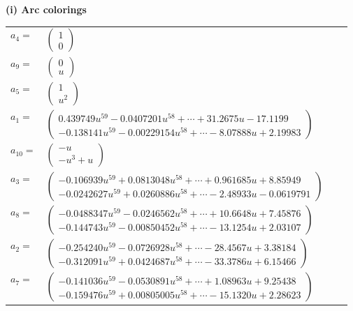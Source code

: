 \documentclass[1p]{elsarticle_modified}
\theoremstyle{definition}
\begin{document}
\flushleft \textbf{(i) Arc colorings}\\
\begin{tabular}{m{7pt} m{180pt} m{7pt} m{180pt} }
\flushright $a_{4}=$&$\begin{pmatrix}1\\0\end{pmatrix}$ \\
\flushright $a_{9}=$&$\begin{pmatrix}0\\u\end{pmatrix}$ \\
\flushright $a_{5}=$&$\begin{pmatrix}1\\u^2\end{pmatrix}$ \\
\flushright $a_{1}=$&$\begin{pmatrix}0.439749 u^{59}-0.0407201 u^{58}+\cdots+31.2675 u-17.1199\\-0.138141 u^{59}-0.00229154 u^{58}+\cdots-8.07888 u+2.19983\end{pmatrix}$ \\
\flushright $a_{10}=$&$\begin{pmatrix}- u\\- u^3+u\end{pmatrix}$ \\
\flushright $a_{3}=$&$\begin{pmatrix}-0.106939 u^{59}+0.0813048 u^{58}+\cdots+0.961685 u+8.85949\\-0.0242627 u^{59}+0.0260886 u^{58}+\cdots-2.48933 u-0.0619791\end{pmatrix}$ \\
\flushright $a_{8}=$&$\begin{pmatrix}-0.0488347 u^{59}-0.0246562 u^{58}+\cdots+10.6648 u+7.45876\\-0.144743 u^{59}-0.00850452 u^{58}+\cdots-13.1254 u+2.03107\end{pmatrix}$ \\
\flushright $a_{2}=$&$\begin{pmatrix}-0.254240 u^{59}-0.0726928 u^{58}+\cdots-28.4567 u+3.38184\\-0.312091 u^{59}+0.0424687 u^{58}+\cdots-33.3786 u+6.15466\end{pmatrix}$ \\
\flushright $a_{7}=$&$\begin{pmatrix}-0.141036 u^{59}-0.0530891 u^{58}+\cdots+1.08963 u+9.25438\\-0.159476 u^{59}+0.00805005 u^{58}+\cdots-15.1320 u+2.28623\end{pmatrix}$ \\

\end{tabular}
\end{document}
